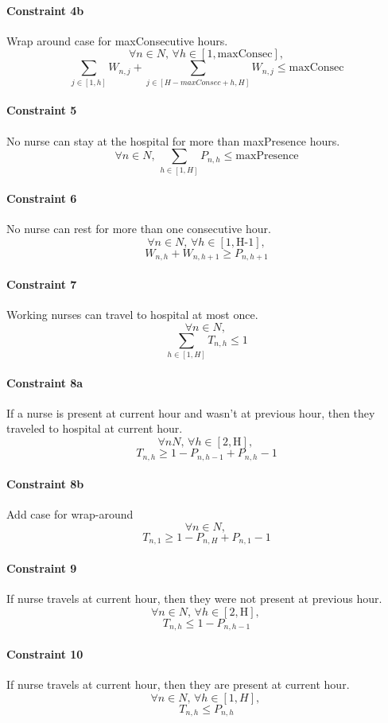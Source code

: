 \documentclass[12pt,a4paper]{article}
\begin{document}
\paragraph{Constraint 4b} Wrap around case for maxConsecutive hours.
$$ \forall n \in N,\, \forall h \in [1, \textrm{maxConsec}],$$
$$\sum_{j \in [1, h]} W_{n, j} +
  \sum_{j \in [H-maxConsec+h, H]} W_{n, j}  \le \textrm{maxConsec}
$$
%
\paragraph{Constraint 5} No nurse can stay at the hospital for more than
maxPresence hours.
$$ \forall n \in N, \, \sum_{h \in [1, H]} P_{n,h} \le \textrm{maxPresence} $$
%
\paragraph{Constraint 6} No nurse can rest for more than one consecutive hour.
$$ \forall n \in N,\, \forall h \in [1, \textrm{H-1}],$$
$$W_{n, h} + W_{n, h+1} \ge P_{n,h+1} $$
%
\paragraph{Constraint 7} Working nurses can travel to hospital at most once.
$$ \forall n \in N,\,$$
$$ \sum_{h \in [1, H]} T_{n,h} \le 1 $$
%
\paragraph{Constraint 8a} If a nurse is present at current hour and wasn't at
previous hour, then they traveled to hospital at current hour.
$$ \forall n N, \,\forall h \in [2, \textrm{H}],\,$$
$$ T_{n,h} \ge 1 - P_{n, h-1} + P_{n, h} - 1 $$
%
\paragraph{Constraint 8b} Add case for wrap-around
$$ \forall n \in N,\,$$
$$ T_{n, 1} \ge 1 - P_{n, H} + P_{n, 1} - 1 $$
%
\paragraph{Constraint 9} If nurse travels at current hour, then they were not
present at previous hour.
$$ \forall n \in N,\,\forall h \in [2, \textrm{H}],\,$$
$$ T_{n,h} \le 1 - P_{n, h-1} $$
%
\paragraph{Constraint 10} If nurse travels at current hour, then they are
present at current hour.
$$ \forall n \in N,\,\forall h \in [1, H],\,$$
$$ T_{n,h} \le P_{n, h} $$
%
%
\end{document}

